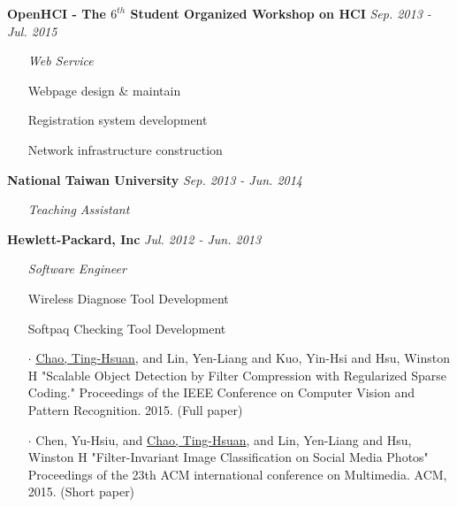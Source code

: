 \documentclass{joel_cv}
\begin{document}
%
%

\vspace{1em}

%
\noindent \hspace{1.2em}
{\bf OpenHCI - The $6^{th}$ Student Organized Workshop on HCI} \hfill {\em Sep. 2013 - Jul. 2015}
\vspace{-0.5em}
\begin{itemize}[leftmargin=1.5em] \item[] {\em Web Service} \end{itemize}
\vspace{-0.5em}
\begin{itemize}[leftmargin=1.5em]
	\itemsep=-0.5em
	\item[] Webpage design \& maintain
	\item[] Registration system development
	\item[] Network infrastructure construction
\end{itemize}

%
\noindent \hspace{1.2em}
{\bf National Taiwan University} \hfill {\em Sep. 2013 - Jun. 2014}
\vspace{-0.5em}
\begin{itemize}[leftmargin=1.5em] \item[] {\em Teaching Assistant} \end{itemize}

%
\noindent \hspace{1.2em}
{\bf Hewlett-Packard, Inc} \hfill {\em Jul. 2012 - Jun. 2013}
\vspace{-0.5em}
\begin{itemize}[leftmargin=1.5em] \item[] {\em Software Engineer} \end{itemize}
\vspace{-0.5em}
\begin{itemize}[leftmargin=1.5em]
	\itemsep=-0.5em
	\item[] Wireless Diagnose Tool Development
	\item[] Softpaq Checking Tool Development
\end{itemize}


%
%

\vspace{1em}

\begin{itemize}
	\itemsep=-0.5em
	\item[$\cdot$] \underline{Chao, Ting-Hsuan}, and Lin, Yen-Liang and Kuo, Yin-Hsi and Hsu, Winston H "Scalable Object Detection by Filter Compression with Regularized Sparse Coding." Proceedings of the IEEE Conference on Computer Vision and Pattern Recognition. 2015. (Full paper)
	\item[$\cdot$] Chen, Yu-Hsiu, and \underline{Chao, Ting-Hsuan}, and Lin, Yen-Liang and Hsu, Winston H "Filter-Invariant Image Classification on Social Media Photos" Proceedings of the 23th ACM international conference on Multimedia. ACM, 2015. (Short paper)
\end{itemize}
\end{document}
